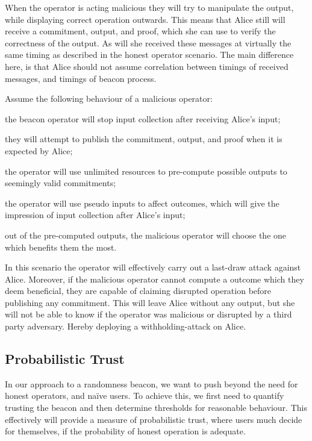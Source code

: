 When the operator is acting malicious they will try to manipulate the output, while displaying correct operation outwards.
This means that Alice still will receive a commitment, output, and proof, which she can use to verify the correctness of the output.
As will she received these messages at virtually the same timing as described in the honest operator scenario.
The main difference here, is that Alice should not assume correlation between timings of received messages, and timings of beacon process.

Assume the following behaviour of a malicious operator:
\begin{eletterate*}
\item the beacon operator will stop input collection after receiving Alice's input;
\item they will attempt to publish the commitment, output, and proof when it is expected by Alice;
\item the operator will use unlimited resources to pre-compute possible outputs to seemingly valid commitments;
\item the operator will use pseudo inputs to affect outcomes, which will give the impression of input collection after Alice's input;
\item out of the pre-computed outputs, the malicious operator will choose the one which benefits them the most.
\end{eletterate*}

In this scenario the operator will effectively carry out a last-draw attack against Alice.
Moreover, if the malicious operator cannot compute a outcome which they deem beneficial, they are capable of claiming disrupted operation before publishing any commitment.
This will leave Alice without any output, but she will not be able to know if the operator was malicious or disrupted by a third party adversary.
Hereby deploying a withholding-attack on Alice.

\subsection{Probabilistic Trust}%
\label{sub:probabilistic_trust}
In our approach to a randomness beacon, we want to push beyond the need for honest operators, and naïve users.
To achieve this, we first need to quantify trusting the beacon and then determine thresholds for reasonable behaviour.
This effectively will provide a measure of probabilistic trust, where users much decide for themselves, if the probability of honest operation is adequate.

